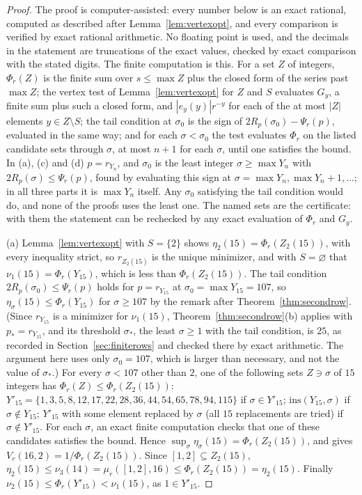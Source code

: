 \documentclass[11pt]{article}
\begin{document}
\begin{proof}
The proof is computer-assisted: every number below is an exact rational,
computed as described after Lemma~\ref{lem:vertexopt}, and every comparison
is verified by exact rational arithmetic.  No floating
point is used, and the decimals in the statement are truncations of the
exact values, checked by exact comparison with the stated digits.  The
finite computation is this.  For a set $Z$ of integers, $\Phi_r(Z)$ is the
finite sum over $s\le\max Z$ plus the closed form of the series past
$\max Z$; the vertex test of Lemma~\ref{lem:vertexopt} for $Z$ and $S$
evaluates $G_y$, a finite sum plus such a closed form, and
$|e_y(y)|r^{-y}$ for each of the at most $|Z|$ elements $y\in Z\setminus
S$; the tail condition at $\sigma_0$ is the sign of
$2R_p(\sigma_0)-\Psi_r(p)$, evaluated in the same way; and for each
$\sigma<\sigma_0$ the test evaluates $\Phi_r$ on the listed candidate
sets through $\sigma$, at most $n+1$ for each $\sigma$, until one
satisfies the bound.  In (a), (c) and (d) $p=r_{Y_n}$, and $\sigma_0$ is the least
integer $\sigma\ge\max Y_n$ with $2R_p(\sigma)\le\Psi_r(p)$, found by
evaluating this sign at $\sigma=\max Y_n,\max Y_n+1,\ldots$; in all three
parts it is $\max Y_n$ itself.  Any $\sigma_0$ satisfying the tail condition
would do, and none of the proofs uses the least one.  The named sets are the
certificate: with them the statement can be rechecked by any exact
evaluation of $\Phi_r$ and $G_y$.

(a) Lemma~\ref{lem:vertexopt} with $S=\{2\}$ shows
$\eta_2(15)=\Phi_r(Z_2(15))$, with every inequality strict, so
$r_{Z_2(15)}$ is the unique minimizer, and with $S=\varnothing$ that
$\nu_1(15)=\Phi_r(Y_{15})$, which is less than $\Phi_r(Z_2(15))$.  The tail
condition $2R_p(\sigma_0)\le\Psi_r(p)$ holds for $p=r_{Y_{15}}$ at
$\sigma_0=\max Y_{15}=107$, so $\eta_\sigma(15)\le\Phi_r(Y_{15})$ for
$\sigma\ge107$ by the remark after Theorem~\ref{thm:secondrow}.  (Since
$r_{Y_{15}}$ is a minimizer for $\nu_1(15)$, Theorem~\ref{thm:secondrow}(b)
applies with $p_*=r_{Y_{15}}$, and its threshold $\sigma_*$, the least
$\sigma\ge1$ with the tail condition, is $25$, as recorded in
Section~\ref{sec:finiterows} and checked there by exact arithmetic.  The
argument here uses only $\sigma_0=107$, which is larger than necessary,
and not the value of $\sigma_*$.)  For every
$\sigma<107$ other than $2$, one of the following sets $Z\ni\sigma$ of $15$ integers has
$\Phi_r(Z)\le\Phi_r(Z_2(15))$:
$Y'_{15}=\{1,3,5,8,12,17,22,28,36,44,54,65,78,94,115\}$ if
$\sigma\in Y'_{15}$; $\mathrm{ins}(Y_{15},\sigma)$ if $\sigma\notin Y_{15}$;
$Y'_{15}$ with some element replaced by $\sigma$ (all $15$ replacements are
tried) if $\sigma\notin Y'_{15}$.
For each $\sigma$, an exact finite computation checks that one of these
candidates satisfies the bound.  Hence
$\sup_\sigma\eta_\sigma(15)=\Phi_r(Z_2(15))$, and
\cite[Proposition~2.1(b)]{coefficient-mass-rows} gives $V_r(16,2)=1/\Phi_r(Z_2(15))$.  Since
$[1,2]\subseteq Z_2(15)$,
$\eta_2(15)\le\nu_3(14)=\mu_r([1,2],16)\le\Phi_r(Z_2(15))=\eta_2(15)$.  Finally
$\nu_2(15)\le\Phi_r(Y'_{15})<\nu_1(15)$, as $1\in Y'_{15}$.


\end{proof}
\end{document}
